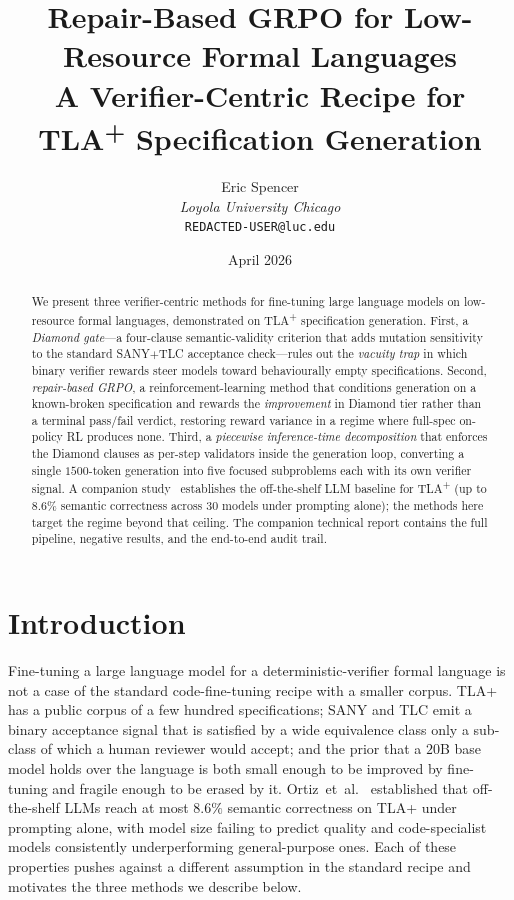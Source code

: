 \documentclass[11pt]{article}
\title{Repair-Based GRPO for Low-Resource Formal Languages\\
\large A Verifier-Centric Recipe for TLA\textsuperscript{+} Specification Generation}
\author{Eric Spencer\\
\small \textit{Loyola University Chicago}\\
\small \texttt{REDACTED-USER@luc.edu}}
\date{April 2026}
\begin{document}
\maketitle

\begin{abstract}
We present three verifier-centric methods for fine-tuning
large language models on low-resource formal languages,
demonstrated on TLA\textsuperscript{+} specification generation.
First, a \emph{Diamond gate}---a four-clause semantic-validity
criterion that adds mutation sensitivity to the standard SANY$+$TLC
acceptance check---rules out the \emph{vacuity trap} in which
binary verifier rewards steer models toward behaviourally empty
specifications. Second, \emph{repair-based GRPO}, a
reinforcement-learning method that conditions generation on a
known-broken specification and rewards the \emph{improvement} in
Diamond tier rather than a terminal pass/fail verdict, restoring
reward variance in a regime where full-spec on-policy RL produces
none. Third, a \emph{piecewise inference-time decomposition} that
enforces the Diamond clauses as per-step validators inside the
generation loop, converting a single $1500$-token generation into
five focused subproblems each with its own verifier signal.
A companion study~\cite{ortiz2026formallm} establishes the
off-the-shelf LLM baseline for TLA\textsuperscript{+}
(up to 8.6\% semantic correctness across 30 models under prompting
alone); the methods here target the regime beyond that ceiling.
The companion technical report contains the full pipeline,
negative results, and the end-to-end audit trail.
\end{abstract}

\section{Introduction}
\label{sec:intro}

Fine-tuning a large language model for a deterministic-verifier formal
language is not a case of the standard code-fine-tuning recipe with a
smaller corpus. TLA+~\cite{lamport2002specifying} has a public corpus
of a few hundred specifications; SANY and TLC emit a binary
acceptance signal that is satisfied by a wide equivalence class only a
sub-class of which a human reviewer would accept; and the prior that a
$20$B base model holds over the language is both small enough to be
improved by fine-tuning and fragile enough to be erased by it.
Ortiz~et~al.~\cite{ortiz2026formallm} established that off-the-shelf
LLMs reach at most $8.6\%$ semantic correctness on TLA+ under
prompting alone, with model size failing to predict quality and
code-specialist models consistently underperforming general-purpose
ones. Each of these properties pushes against a different assumption
in the standard recipe and motivates the three methods we describe
below.
\end{document}

